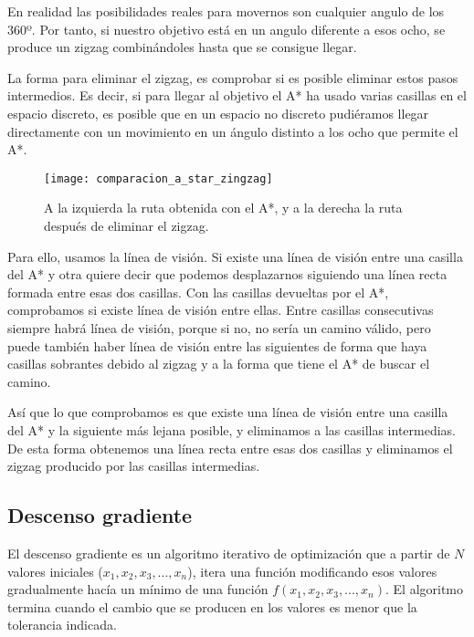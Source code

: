 En realidad las posibilidades reales para movernos son cualquier angulo de los 360º. Por tanto, si nuestro objetivo está en un angulo diferente a esos ocho, se produce un zigzag combinándoles hasta que se consigue llegar.

La forma para eliminar el zigzag, es comprobar si es posible eliminar estos pasos intermedios. Es decir, si para llegar al objetivo el A* ha usado varias casillas en el espacio discreto, es posible que en un espacio no discreto pudiéramos llegar directamente con un movimiento en un ángulo distinto a los ocho que permite el A*.

\begin{figure}[!htpb]
    \centering
    \texttt{[image: comparacion\_a\_star\_zingzag]}
    \caption[Comparación entre la ruta del A* con y sin zigzag]{A la izquierda la ruta obtenida con el A*, y a la derecha la ruta después de eliminar el zigzag.}
    \label{fig:basics AFM sketch}
\end{figure}

Para ello, usamos la línea de visión. Si existe una línea de visión entre una casilla del A* y otra quiere decir que podemos desplazarnos siguiendo una línea recta formada entre esas dos casillas. Con las casillas devueltas por el A*, comprobamos si existe línea de visión entre ellas. Entre casillas consecutivas siempre habrá línea de visión, porque si no, no sería un camino válido, pero puede también haber línea de visión entre las siguientes de forma que haya casillas sobrantes debido al zigzag y a la forma que tiene el A* de buscar el camino.

Así que lo que comprobamos es que existe una línea de visión entre una casilla del A* y la siguiente más lejana posible, y eliminamos a las casillas intermedias. De esta forma obtenemos una línea recta entre esas dos casillas y eliminamos el zigzag producido por las casillas intermedias.

\subsection{Descenso gradiente}

El descenso gradiente es un algoritmo iterativo de optimización que a partir de $N$ valores iniciales ($x_1, x_2, x_3, ..., x_n$), itera una función modificando esos valores gradualmente hacía un mínimo de una función $f(x_1, x_2, x_3, ..., x_n)$. El algoritmo termina cuando el cambio que se producen en los valores es menor que la tolerancia indicada.

